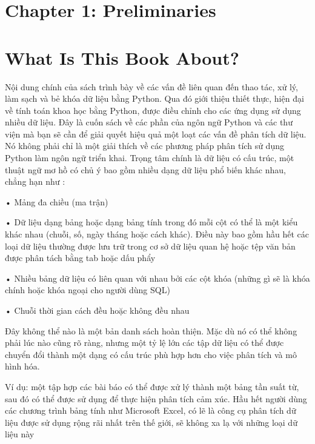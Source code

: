 \newpage 
\section*{\LARGE Chapter 1: Preliminaries}
\section{What Is This Book About?}
\quad Nội dung chính của sách trình bày về các vấn đề liên quan đến thao tác, xử lý, làm sạch và bẻ khóa dữ liệu bằng Python. Qua đó giới thiệu thiết thực, hiện đại về tính toán khoa học bằng Python, được điều chỉnh cho các ứng dụng sử dụng nhiều dữ liệu. Đây là cuốn sách về các phần của ngôn ngữ Python và các thư viện mà bạn sẽ cần để giải quyết hiệu quả một loạt các vấn đề phân tích dữ liệu. Nó không phải chỉ là một giải thích về các phương pháp phân tích sử dụng Python làm ngôn ngữ triển khai.
Trọng tâm chính là dữ liệu có cấu trúc, một thuật ngữ mơ hồ có chủ ý bao gồm nhiều dạng dữ liệu phổ biến khác nhau, chẳng hạn như :\par
• Mảng đa chiều (ma trận)\par
• Dữ liệu dạng bảng hoặc dạng bảng tính trong đó mỗi cột có thể là một kiểu khác nhau (chuỗi, số, ngày tháng hoặc cách khác). Điều này bao gồm hầu hết các loại dữ liệu thường được lưu trữ trong cơ sở dữ liệu quan hệ hoặc tệp văn bản được phân tách bằng tab hoặc dấu phẩy\par
• Nhiều bảng dữ liệu có liên quan với nhau bởi các cột khóa (những gì sẽ là khóa chính hoặc khóa ngoại cho người dùng SQL)\par
• Chuỗi thời gian cách đều hoặc không đều nhau\par
Đây không thể nào là một bản danh sách hoàn thiện. Mặc dù nó có thể không phải lúc nào cũng rõ ràng, nhưng một tỷ lệ lớn các tập dữ liệu có thể được chuyển đổi thành một dạng có cấu trúc phù hợp hơn cho việc phân tích và mô hình hóa. \par
Ví dụ: một tập hợp các bài báo có thể được xử lý thành một bảng tần suất từ, sau đó có thể được sử dụng để thực hiện phân tích cảm xúc. Hầu hết người dùng các chương trình bảng tính như Microsoft Excel, có lẽ là công cụ phân tích dữ liệu được sử dụng rộng rãi nhất trên thế giới, sẽ không xa lạ với những loại dữ liệu này
